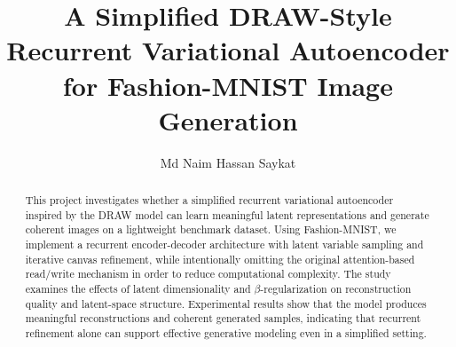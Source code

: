 \documentclass[11pt,a4paper]{article}
\title{A Simplified DRAW-Style Recurrent Variational Autoencoder for Fashion-MNIST Image Generation}
\author{
Md Naim Hassan Saykat
}
\date{}
\begin{document}
\maketitle
\begin{abstract}
This project investigates whether a simplified recurrent variational autoencoder inspired by the DRAW model can learn meaningful latent representations and generate coherent images on a lightweight benchmark dataset. Using Fashion-MNIST, we implement a recurrent encoder-decoder architecture with latent variable sampling and iterative canvas refinement, while intentionally omitting the original attention-based read/write mechanism in order to reduce computational complexity. The study examines the effects of latent dimensionality and $\beta$-regularization on reconstruction quality and latent-space structure. Experimental results show that the model produces meaningful reconstructions and coherent generated samples, indicating that recurrent refinement alone can support effective generative modeling even in a simplified setting.
\end{abstract}
\end{document}
